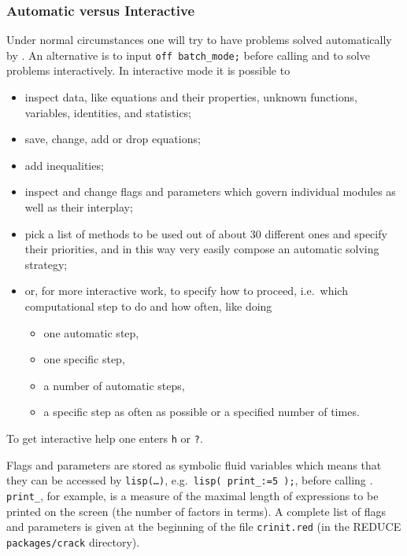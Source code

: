 \subsubsection{Automatic versus Interactive}

Under normal circumstances one will try to have problems solved
automatically by .  An alternative is to input
\texttt{off batch\_mode;} before calling  and to solve
problems interactively.  In interactive mode it is possible to
\begin{itemize}
\item inspect data, like equations and their properties, unknown
  functions, variables, identities, and statistics;
\item save, change, add or drop equations;
\item add inequalities;
\item inspect and change flags and parameters which govern individual
  modules as well as their interplay;
\item pick a list of methods to be used out of about 30 different ones
  and specify their priorities, and in this way very easily compose an
  automatic solving strategy;
\item or, for more interactive work, to specify how to proceed,
  i.e.\ which computational step to do and how often, like doing
  \begin{itemize}
  \item one automatic step,
  \item one specific step,
  \item a number of automatic steps,
  \item a specific step as often as possible or a specified number of times.
  \end{itemize}
\end{itemize}
To get interactive help one enters \texttt{h} or \texttt{?}.

Flags and parameters are stored as symbolic fluid variables which
means that they can be accessed by \texttt{lisp(\ldots)},
e.g.\ \texttt{lisp( print\_:=5 );}, before calling .
\texttt{print\_}, for example, is a measure of the maximal length of
expressions to be printed on the screen (the number of factors in
terms).  A complete list of flags and parameters is given at the
beginning of the file \texttt{crinit.red} (in the REDUCE
\texttt{packages/crack} directory).


